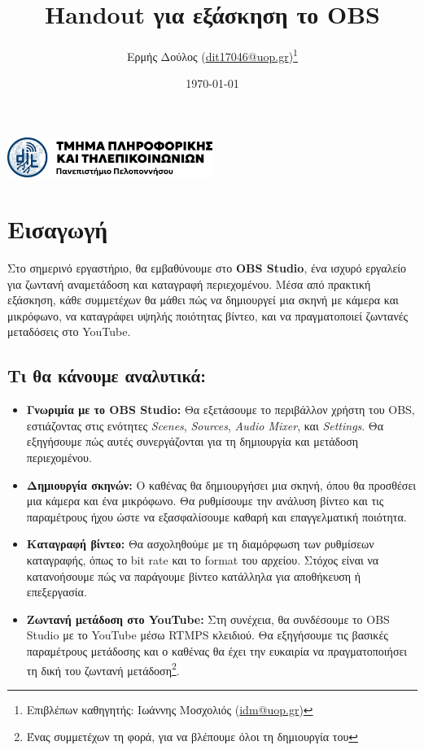 \documentclass[12pt,a4paper]{article}
\title{\textbf{Handout για εξάσκηση το OBS}}
\author{Ερμής Δούλος (\href{mailto:dit17046@uop.gr}{dit17046@uop.gr})\thanks{Επιβλέπων καθηγητής: Ιωάννης Μοσχολιός (\href{mailto:idm@uop.gr}{idm@uop.gr})}}
\date{\today}
\begin{document}
\maketitle
\begin{center}
  \includegraphics[width=0.5\textwidth]{Figures/uop.png}
\end{center}
\tableofcontents
\noindent\makebox[\linewidth]{\rule{\textwidth}{1.5pt}}

\section*{Εισαγωγή}

Στο σημερινό εργαστήριο, θα εμβαθύνουμε στο \textbf{OBS Studio}, ένα ισχυρό εργαλείο
για ζωντανή αναμετάδοση και καταγραφή περιεχομένου. Μέσα από πρακτική εξάσκηση,
κάθε συμμετέχων θα μάθει πώς να δημιουργεί μια σκηνή με κάμερα και μικρόφωνο, να
καταγράφει υψηλής ποιότητας βίντεο, και να πραγματοποιεί ζωντανές μεταδόσεις στο
YouTube.

\subsection*{Τι θα κάνουμε αναλυτικά:}

\begin{itemize}
  \item \textbf{Γνωριμία με το OBS Studio:} Θα εξετάσουμε το περιβάλλον χρήστη του
        OBS, εστιάζοντας στις ενότητες \textit{Scenes}, \textit{Sources}, \textit{Audio
          Mixer}, και \textit{Settings}. Θα εξηγήσουμε πώς αυτές συνεργάζονται για τη
        δημιουργία και μετάδοση περιεχομένου.

  \item \textbf{Δημιουργία σκηνών:} Ο καθένας θα δημιουργήσει μια σκηνή, όπου θα
        προσθέσει μια κάμερα και ένα μικρόφωνο. Θα ρυθμίσουμε την ανάλυση βίντεο και τις
        παραμέτρους ήχου ώστε να εξασφαλίσουμε καθαρή και επαγγελματική ποιότητα.

  \item \textbf{Καταγραφή βίντεο:} Θα ασχοληθούμε με τη διαμόρφωση των ρυθμίσεων
        καταγραφής, όπως το bit rate και το format του αρχείου. Στόχος είναι να κατανοήσουμε
        πώς να παράγουμε βίντεο κατάλληλα για αποθήκευση ή επεξεργασία.

  \item \textbf{Ζωντανή μετάδοση στο YouTube:} Στη συνέχεια, θα συνδέσουμε το OBS
        Studio με το YouTube μέσω RTMPS κλειδιού. Θα εξηγήσουμε τις βασικές παραμέτρους
        μετάδοσης και ο καθένας θα έχει την ευκαιρία να πραγματοποιήσει τη δική του
        ζωντανή μετάδοση\footnote{Ένας συμμετέχων τη φορά, για να βλέπουμε όλοι τη δημιουργία του}.
\end{itemize}
\end{document}
